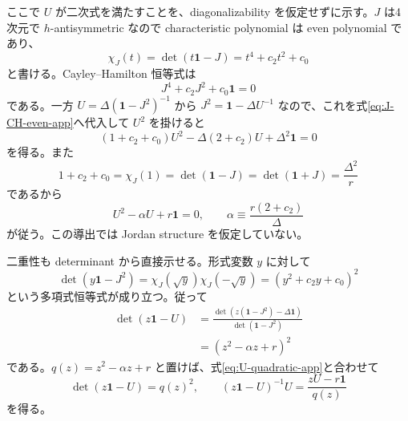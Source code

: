 \documentclass[a4paper,11pt]{ltjsarticle}
\numberwithin{equation}{section}
\newcommand{\Id}{\mathbf 1}
\begin{document}
ここで $U$ が二次式を満たすことを、diagonalizability を仮定せずに示す。$J$ は4次元で $h$-antisymmetric なので characteristic polynomial は even polynomial であり、
\begin{equation}
 \chi_J(t)=\det(t\Id-J)=t^4+c_2t^2+c_0
 \label{eq:J-even-char-app}
\end{equation}
と書ける。Cayley--Hamilton 恒等式は
\begin{equation}
 J^4+c_2J^2+c_0\Id=0
 \label{eq:J-CH-even-app}
\end{equation}
である。一方 $U=\Delta(\Id-J^2)^{-1}$ から $J^2=\Id-\Delta U^{-1}$ なので、これを式\eqref{eq:J-CH-even-app}へ代入して $U^2$ を掛けると
\begin{equation}
 (1+c_2+c_0)U^2-\Delta(2+c_2)U+\Delta^2\Id=0
 \label{eq:U-quadratic-pre-app}
\end{equation}
を得る。また
\begin{equation}
 1+c_2+c_0=\chi_J(1)=\det(\Id-J)=\det(\Id+J)=\frac{\Delta^2}{r}
 \label{eq:J-char-at-one-app}
\end{equation}
であるから
\begin{equation}
 U^2-\alpha U+r\Id=0,
 \qquad
 \alpha\equiv\frac{r(2+c_2)}{\Delta}
 \label{eq:U-quadratic-app}
\end{equation}
が従う。この導出では Jordan structure を仮定していない。

二重性も determinant から直接示せる。形式変数 $y$ に対して
\begin{equation}
 \det(y\Id-J^2)
 =\chi_J(\sqrt y)\chi_J(-\sqrt y)
 =\left(y^2+c_2y+c_0\right)^2
 \label{eq:J2-char-square-app}
\end{equation}
という多項式恒等式が成り立つ。従って
\begin{align}
 \det(z\Id-U)
 &=\frac{\det\!\left(z(\Id-J^2)-\Delta\Id\right)}{\det(\Id-J^2)}\nonumber\\
 &=\left(z^2-\alpha z+r\right)^2
 \label{eq:U-char-square-app}
\end{align}
である。$q(z)=z^2-\alpha z+r$ と置けば、式\eqref{eq:U-quadratic-app}と合わせて
\begin{equation}
 \det(z\Id-U)=q(z)^2,
 \qquad
 (z\Id-U)^{-1}U=\frac{zU-r\Id}{q(z)}
 \label{eq:U-resolvent-app}
\end{equation}
を得る。
\end{document}
